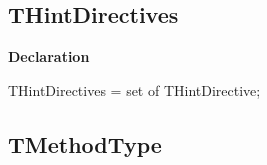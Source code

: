 \documentclass{report}
\newif\ifpdf
\begin{document}
\subsection*{THintDirectives}
\fi
\label{PasDoc_Items-THintDirectives}
\begin{list}{}{
\setlength{\itemindent}{0cm}
\setlength{\listparindent}{0cm}
\setlength{\leftmargin}{\evensidemargin}
\addtolength{\leftmargin}{\tmplength}
\settowidth{\labelsep}{X}
\addtolength{\leftmargin}{\labelsep}
\setlength{\labelwidth}{\tmplength}
}
\item[\textbf{Declaration}\hfill]
\ifpdf
\begin{flushleft}
\fi
\begin{ttfamily}
THintDirectives = set of THintDirective;\end{ttfamily}

\ifpdf
\end{flushleft}
\fi

\end{list}
\ifpdf
\subsection*{\large{\textbf{TMethodType}}\normalsize\hspace{1ex}\hrulefill}
\else
\end{document}

